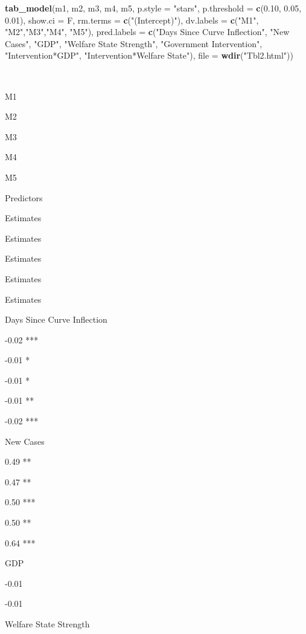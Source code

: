 \documentclass[
]{article}
\newenvironment{Shaded}{\begin{snugshade}}{\end{snugshade}}
\newcommand{\DataTypeTok}[1]{\textcolor[rgb]{0.13,0.29,0.53}{#1}}
\newcommand{\FloatTok}[1]{\textcolor[rgb]{0.00,0.00,0.81}{#1}}
\newcommand{\KeywordTok}[1]{\textcolor[rgb]{0.13,0.29,0.53}{\textbf{#1}}}
\newcommand{\NormalTok}[1]{#1}
\newcommand{\StringTok}[1]{\textcolor[rgb]{0.31,0.60,0.02}{#1}}
\begin{document}
\begin{Shaded}
\begin{Highlighting}[]
\KeywordTok{tab_model}\NormalTok{(m1, m2, m3, m4, m5, }\DataTypeTok{p.style =} \StringTok{"stars"}\NormalTok{, }\DataTypeTok{p.threshold =} \KeywordTok{c}\NormalTok{(}\FloatTok{0.10}\NormalTok{, }\FloatTok{0.05}\NormalTok{, }\FloatTok{0.01}\NormalTok{), }\DataTypeTok{show.ci =}\NormalTok{ F, }\DataTypeTok{rm.terms =} \KeywordTok{c}\NormalTok{(}\StringTok{"(Intercept)"}\NormalTok{),  }\DataTypeTok{dv.labels =} \KeywordTok{c}\NormalTok{(}\StringTok{"M1"}\NormalTok{, }\StringTok{"M2"}\NormalTok{,}\StringTok{"M3"}\NormalTok{,}\StringTok{"M4"}\NormalTok{, }\StringTok{"M5"}\NormalTok{), }\DataTypeTok{pred.labels =} \KeywordTok{c}\NormalTok{(}\StringTok{"Days Since Curve Inflection"}\NormalTok{, }\StringTok{"New Cases"}\NormalTok{,  }\StringTok{"GDP"}\NormalTok{, }\StringTok{"Welfare State Strength"}\NormalTok{, }\StringTok{"Government Intervention"}\NormalTok{, }\StringTok{"Intervention*GDP"}\NormalTok{, }\StringTok{"Intervention*Welfare State"}\NormalTok{), }\DataTypeTok{file =} \KeywordTok{wdir}\NormalTok{(}\StringTok{"Tbl2.html"}\NormalTok{))}
\end{Highlighting}
\end{Shaded}

~

M1

M2

M3

M4

M5

Predictors

Estimates

Estimates

Estimates

Estimates

Estimates

Days Since Curve Inflection

-0.02 ***

-0.01 *

-0.01 *

-0.01 **

-0.02 ***

New Cases

0.49 **

0.47 **

0.50 ***

0.50 **

0.64 ***

GDP

-0.01

-0.01

Welfare State Strength
\end{document}
